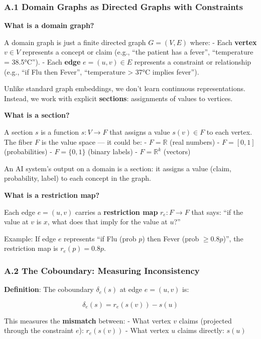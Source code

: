 \documentclass[
]{article}
\begin{document}
\subsubsection{A.1 Domain Graphs as Directed Graphs with
Constraints}\label{a.1-domain-graphs-as-directed-graphs-with-constraints}

\textbf{What is a domain graph?}

A domain graph is just a finite directed graph \(G = (V, E)\) where: -
Each \textbf{vertex} \(v \in V\) represents a concept or claim (e.g.,
``the patient has a fever'', ``temperature = 38.5°C''). - Each
\textbf{edge} \(e = (u, v) \in E\) represents a constraint or
relationship (e.g., ``if Flu then Fever'', ``temperature \textgreater{}
37°C implies fever'').

Unlike standard graph embeddings, we don't learn continuous
representations. Instead, we work with explicit \textbf{sections}:
assignments of values to vertices.

\textbf{What is a section?}

A section \(s\) is a function \(s: V \to F\) that assigns a value
\(s(v) \in F\) to each vertex. The fiber \(F\) is the value space --- it
could be: - \(F = \mathbb{R}\) (real numbers) - \(F = [0, 1]\)
(probabilities) - \(F = \{0, 1\}\) (binary labels) -
\(F = \mathbb{R}^k\) (vectors)

An AI system's output on a domain is a section: it assigns a value
(claim, probability, label) to each concept in the graph.

\textbf{What is a restriction map?}

Each edge \(e = (u, v)\) carries a \textbf{restriction map}
\(r_e: F \to F\) that says: ``if the value at \(v\) is \(x\), what does
that imply for the value at \(u\)?''

Example: If edge \(e\) represents ``if Flu (prob \(p\)) then Fever (prob
\(\geq 0.8p\))'', the restriction map is \(r_e(p) = 0.8p\).

\subsubsection{A.2 The Coboundary: Measuring
Inconsistency}\label{a.2-the-coboundary-measuring-inconsistency}

\textbf{Definition}: The coboundary \(\delta_e(s)\) at edge
\(e = (u, v)\) is:

\[\delta_e(s) = r_e(s(v)) - s(u)\]

This measures the \textbf{mismatch} between: - What vertex \(v\) claims
(projected through the constraint \(e\)): \(r_e(s(v))\) - What vertex
\(u\) claims directly: \(s(u)\)
\end{document}
